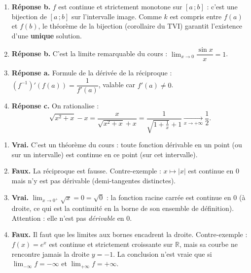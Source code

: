 \documentclass[11pt]{article}
\begin{document}
\begin{corrige}
\begin{enumerate}
\item \textbf{Réponse b.} $f$ est continue et strictement monotone sur $[a\,;b]$ : c'est une bijection de $[a\,;b]$ sur l'intervalle image. Comme $k$ est compris entre $f(a)$ et $f(b)$, le théorème de la bijection (corollaire du TVI) garantit l'existence d'une \textbf{unique} solution.
\item \textbf{Réponse b.} C'est la limite remarquable du cours : $\displaystyle\lim_{x\to 0}\dfrac{\sin x}{x}=1$.
\item \textbf{Réponse a.} Formule de la dérivée de la réciproque : $(f^{-1})'(f(a))=\dfrac{1}{f'(a)}$, valable car $f'(a)\neq 0$.
\item \textbf{Réponse c.} On rationalise :
\[\sqrt{x^2+x}-x=\dfrac{x}{\sqrt{x^2+x}+x}=\dfrac{1}{\sqrt{1+\frac{1}{x}}+1}\xrightarrow[x\to+\infty]{}\dfrac{1}{2}.\]
\end{enumerate}
\end{corrige}

\begin{corrige}
\begin{enumerate}
\item \textbf{Vrai.} C'est un théorème du cours : toute fonction dérivable en un point (ou sur un intervalle) est continue en ce point (sur cet intervalle).
\item \textbf{Faux.} La réciproque est fausse. Contre-exemple : $x\mapsto |x|$ est continue en $0$ mais n'y est pas dérivable (demi-tangentes distinctes).
\item \textbf{Vrai.} $\displaystyle\lim_{x\to 0^+}\sqrt{x}=0=\sqrt{0}$ : la fonction racine carrée est continue en $0$ (à droite, ce qui est la continuité en la borne de son ensemble de définition). Attention : elle n'est pas \emph{dérivable} en $0$.
\item \textbf{Faux.} Il faut que les limites aux bornes encadrent la droite. Contre-exemple : $f(x)=e^{x}$ est continue et strictement croissante sur $\mathbb{R}$, mais sa courbe ne rencontre jamais la droite $y=-1$. La conclusion n'est vraie que si $\displaystyle\lim_{-\infty}f=-\infty$ et $\displaystyle\lim_{+\infty}f=+\infty$.
\end{enumerate}
\end{corrige}
\end{document}
